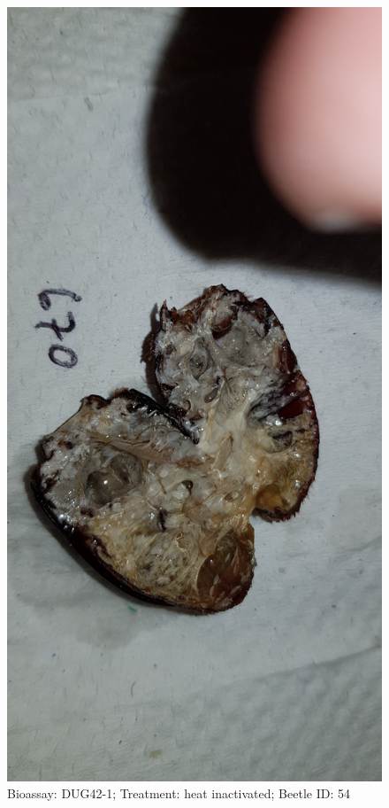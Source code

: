 \documentclass[11pt]{scrartcl}
\begin{document}
\begin{figure}[h!]
    \centering
    \includegraphics[width=\linewidth, height=\textheight, keepaspectratio]{uploads/btl.pm_image.9ddaa0b244e4bd35.4475673432203637305f5265702d3120636f6e74726f6c2e6a7067.jpg}
    \caption{Bioassay: DUG42-1; Treatment: heat inactivated; Beetle ID: 54}
\end{figure}
\clearpage
\end{document}
